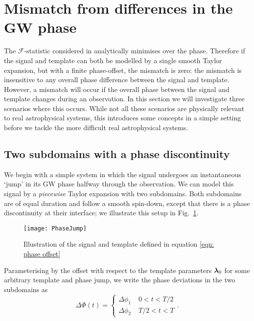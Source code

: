 \documentclass[../full_thesis/full_thesis.tex]{subfiles}
\begin{document}
\section{Mismatch from differences in the GW phase}
\label{sec: mismatch from differences in the gw phase}

The $\mathcal{F}$-statistic considered in \citet{Brady1998} analytically
minimises over the phase. Therefore if the signal and template can both be
modelled by a single smooth Taylor expansion, but with a finite phase-offset,
the mismatch is zero: the mismatch is insensitive to any overall phase
difference between the signal and template. However, a mismatch will occur if
the overall phase between the signal and template changes during an
observation. In this section we will investigate three scenarios where this
occurs. While not all these scenarios are physically relevant to real astrophysical
systems, this introduces some concepts in a simple setting before we tackle
the more difficult real astrophysical systems.

\subsection{Two subdomains with a phase discontinuity}
\label{sec: Two segments with a phase offset}

We begin with a simple system in which the signal undergoes an instantaneous
`jump' in its GW phase halfway through the observation. We can model this
signal by a \emph{piecewise} Taylor expansion with two subdomains.  Both
subdomains are of equal duration and follow a smooth spin-down, except that
there is a phase discontinuity at their interface; we illustrate this setup in
Fig.~\ref{fig: PhaseJump}.
\begin{figure}[htb]
    \centering
    \texttt{[image: PhaseJump]}
    \caption{Illustration of the signal and template defined in equation
        \eqref{eqn: phase offset}}
    \label{fig: PhaseJump}
\end{figure}
Parameterising by the offset with respect to the template parameters ${\bm{\lambda}}_{0}$ for some
arbitrary template and phase jump, we write the phase deviations in the two
subdomains as
\begin{equation}
 \Delta\Phi(t) = \left\{
\begin{array}{cr}
\Delta \phi_{1}& \; 0 < t < T/2 \\
\Delta \phi_{2} & \;  T/2 < t < T
\end{array}.
\right.
\label{eqn: phase offset}
\end{equation}
\end{document}
